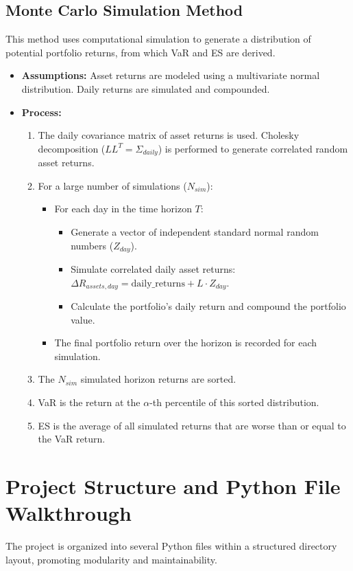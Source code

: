 \documentclass[11pt,a4paper]{article}
\begin{document}
\subsection{Monte Carlo Simulation Method}
This method uses computational simulation to generate a distribution of potential portfolio returns, from which VaR and ES are derived.
\begin{itemize}
    \item \textbf{Assumptions:} Asset returns are modeled using a multivariate normal distribution. Daily returns are simulated and compounded.
    \item \textbf{Process:}
    \begin{enumerate}
        \item The daily covariance matrix of asset returns is used. Cholesky decomposition ($LL^T = \Sigma_{daily}$) is performed to generate correlated random asset returns.
        \item For a large number of simulations ($N_{sim}$):
            \begin{itemize}
                \item For each day in the time horizon $T$:
                    \begin{itemize}
                        \item Generate a vector of independent standard normal random numbers ($Z_{day}$).
                        \item Simulate correlated daily asset returns: $\Delta R_{assets,day} = \text{daily\_returns} + L \cdot Z_{day}$.
                        \item Calculate the portfolio's daily return and compound the portfolio value.
                    \end{itemize}
                \item The final portfolio return over the horizon is recorded for each simulation.
            \end{itemize}
        \item The $N_{sim}$ simulated horizon returns are sorted.
        \item VaR is the return at the $\alpha$-th percentile of this sorted distribution.
        \item ES is the average of all simulated returns that are worse than or equal to the VaR return.
    \end{enumerate}
\end{itemize}

\section{Project Structure and Python File Walkthrough}
The project is organized into several Python files within a structured directory layout, promoting modularity and maintainability.
\end{document}
